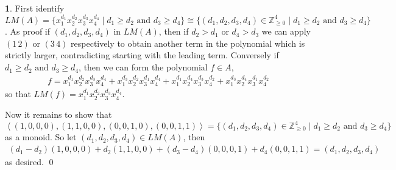 \documentclass[11pt]{article}
\theoremstyle{definition}
\newtheorem{pb}{}
\newcommand{\set}[1]{\{#1\}}
\newcommand{\gen}[1]{\left\langle #1 \right\rangle}
\newcommand{\tand}{\text{ and }}
\begin{document}
    \begin{pb}
        First identify \(LM(A) = \set{x_1^{d_1}x_2^{d_2}x_3^{d_3}x_4^{d_4} \mid d_1 \geq d_2 \tand d_3 \geq d_4} \cong \set{(d_1,d_2,d_3,d_4) \in \mathbb{Z}_{\geq 0}^4 \mid d_1 \geq d_2 \tand d_3 \geq d_4}\). As proof if \((d_1,d_2,d_3,d_4)\) in \(LM(A)\), then if \(d_2 > d_1\) or \(d_4 > d_3\) we can apply \((1\,2)\) or \((3\,4)\) respectively to obtain another term in the polynomial which is strictly larger, contradicting starting with the leading term. Conversely if \(d_1 \geq d_2 \tand d_3 \geq d_4\), then we can form the polynomial \(f \in A\),
        \begin{align*}
            f = x_1^{d_1}x_2^{d_2}x_3^{d_3}x_4^{d_4} + x_1^{d_3}x_2^{d_2}x_3^{d_1}x_4^{d_4} + x_1^{d_1}x_2^{d_4}x_3^{d_3}x_4^{d_2} + x_1^{d_3}x_2^{d_4}x_3^{d_1}x_4^{d_2}
        \end{align*}
        so that \(LM(f) = x_1^{d_1}x_2^{d_2}x_3^{d_3}x_4^{d_4}\).

        Now it remains to show that \(\gen{(1,0,0,0),(1,1,0,0),(0,0,1,0),(0,0,1,1)} = \set{(d_1,d_2,d_3,d_4) \in \mathbb{Z}_{\geq 0}^4 \mid d_1 \geq d_2 \tand d_3 \geq d_4}\) as a monoid. So let \((d_1,d_2,d_3,d_4) \in LM(A)\), then
        \begin{align*}
            (d_1 - d_2)(1,0,0,0) + d_2(1,1,0,0) + (d_3 - d_4)(0,0,0,1) + d_4(0,0,1,1) = (d_1,d_2,d_3,d_4)
        \end{align*}
        as desired. \qed
    \end{pb}
\end{document}
